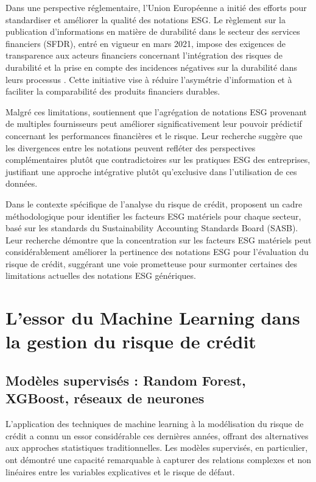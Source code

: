 Dans une perspective réglementaire, l'Union Européenne a initié des efforts pour standardiser et améliorer la qualité des notations ESG. Le règlement sur la publication d'informations en matière de durabilité dans le secteur des services financiers (SFDR), entré en vigueur en mars 2021, impose des exigences de transparence aux acteurs financiers concernant l'intégration des risques de durabilité et la prise en compte des incidences négatives sur la durabilité dans leurs processus \citep{commission2019}. Cette initiative vise à réduire l'asymétrie d'information et à faciliter la comparabilité des produits financiers durables.

Malgré ces limitations, \citet{gibson2021} soutiennent que l'agrégation de notations ESG provenant de multiples fournisseurs peut améliorer significativement leur pouvoir prédictif concernant les performances financières et le risque. Leur recherche suggère que les divergences entre les notations peuvent refléter des perspectives complémentaires plutôt que contradictoires sur les pratiques ESG des entreprises, justifiant une approche intégrative plutôt qu'exclusive dans l'utilisation de ces données.

Dans le contexte spécifique de l'analyse du risque de crédit, \citet{khan2021} proposent un cadre méthodologique pour identifier les facteurs ESG matériels pour chaque secteur, basé sur les standards du Sustainability Accounting Standards Board (SASB). Leur recherche démontre que la concentration sur les facteurs ESG matériels peut considérablement améliorer la pertinence des notations ESG pour l'évaluation du risque de crédit, suggérant une voie prometteuse pour surmonter certaines des limitations actuelles des notations ESG génériques.

\section{L'essor du Machine Learning dans la gestion du risque de crédit}

\subsection{Modèles supervisés : Random Forest, XGBoost, réseaux de neurones}

L'application des techniques de machine learning à la modélisation du risque de crédit a connu un essor considérable ces dernières années, offrant des alternatives aux approches statistiques traditionnelles. Les modèles supervisés, en particulier, ont démontré une capacité remarquable à capturer des relations complexes et non linéaires entre les variables explicatives et le risque de défaut.

